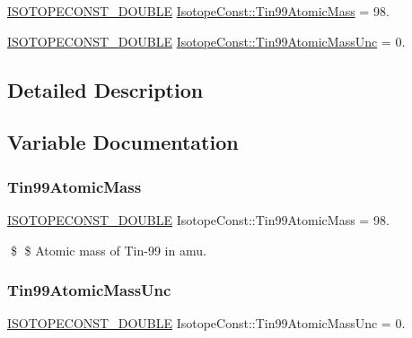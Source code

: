 \begin{DoxyCompactItemize}
\item 
\mbox{\hyperlink{group___isotope_const-_macros_ga8f45a7272ce02c0b4c65c44636ed719a}{I\+S\+O\+T\+O\+P\+E\+C\+O\+N\+S\+T\+\_\+\+D\+O\+U\+B\+LE}} \mbox{\hyperlink{group___isotope_const-_tin-_sn99_gaef67fbcf71372b150ebd12a152d6f5cc}{Isotope\+Const\+::\+Tin99\+Atomic\+Mass}} = 98.
\item 
\mbox{\hyperlink{group___isotope_const-_macros_ga8f45a7272ce02c0b4c65c44636ed719a}{I\+S\+O\+T\+O\+P\+E\+C\+O\+N\+S\+T\+\_\+\+D\+O\+U\+B\+LE}} \mbox{\hyperlink{group___isotope_const-_tin-_sn99_gaf5d17e0e67096a3eef1aa8522fb4cd94}{Isotope\+Const\+::\+Tin99\+Atomic\+Mass\+Unc}} = 0.
\end{DoxyCompactItemize}


\subsection{Detailed Description}


\subsection{Variable Documentation}
\mbox{\label{group___isotope_const-_tin-_sn99_gaef67fbcf71372b150ebd12a152d6f5cc}} 
\subsubsection{\texorpdfstring{Tin99\+Atomic\+Mass}{Tin99AtomicMass}}
{\footnotesize\ttfamily \mbox{\hyperlink{group___isotope_const-_macros_ga8f45a7272ce02c0b4c65c44636ed719a}{I\+S\+O\+T\+O\+P\+E\+C\+O\+N\+S\+T\+\_\+\+D\+O\+U\+B\+LE}} Isotope\+Const\+::\+Tin99\+Atomic\+Mass = 98.}

\$ \$ Atomic mass of Tin-\/99 in amu. \mbox{\label{group___isotope_const-_tin-_sn99_gaf5d17e0e67096a3eef1aa8522fb4cd94}} 
\subsubsection{\texorpdfstring{Tin99\+Atomic\+Mass\+Unc}{Tin99AtomicMassUnc}}
{\footnotesize\ttfamily \mbox{\hyperlink{group___isotope_const-_macros_ga8f45a7272ce02c0b4c65c44636ed719a}{I\+S\+O\+T\+O\+P\+E\+C\+O\+N\+S\+T\+\_\+\+D\+O\+U\+B\+LE}} Isotope\+Const\+::\+Tin99\+Atomic\+Mass\+Unc = 0.}

